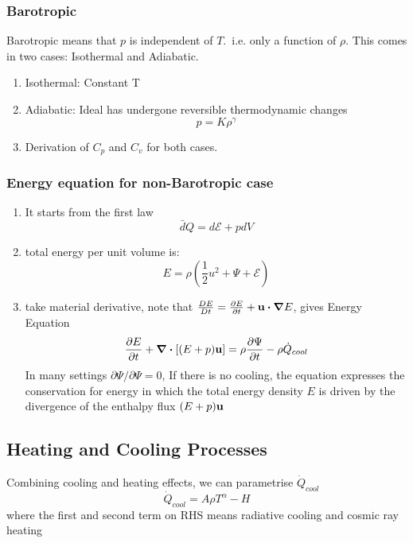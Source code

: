 \documentclass[12pt,a4paper]{article}
\begin{document}
    \subsubsection{Barotropic}
        Barotropic means that $p$ is independent of $T$.\ i.e. only a function of $\rho$. This comes in two cases: Isothermal and Adiabatic.
        \begin{enumerate}
            \item Isothermal: Constant T
            \item Adiabatic: Ideal has undergone reversible thermodynamic changes
            \begin{equation}
                p= K \rho^{\gamma}
            \end{equation} 
            \item Derivation of $C_p$ and $C_v$ for both cases.
        \end{enumerate}
    \subsubsection{Energy equation for non-Barotropic case}
        \begin{enumerate}
            \item It starts from the first law
            \begin{equation}
                \bar{d}Q = d \mathcal{E} + pdV
            \end{equation}
            \item total energy per unit volume is:
            \begin{equation}
                E=\rho(\frac{1}{2}u^2 +\Psi + \mathcal{E})
            \end{equation}
            \item take material derivative, note that $\frac{DE}{Dt}=\pdv{E}{t}+\vb{u}\dotproduct\grad{E}$, gives Energy Equation
            \begin{equation}
                \pdv{E}{t}+\div{[(E+p)\vb{u}]= \rho\pdv{\Psi}{t}-\rho \dot{Q}_{cool}}
            \end{equation}
            In many settings $\partial{\Psi}/\partial{\Psi}=0$, If there is no cooling, the equation expresses the conservation for energy in which
            the total energy density $E$ is driven by the divergence of the enthalpy flux $(E+p)\vb{u}$
        \end{enumerate}
    \subsection{Heating and Cooling Processes}
        Combining cooling and heating effects, we can parametrise $\dot{Q}_{cool}$
        \begin{equation}
            \dot{Q}_{cool} = A \rho T^{\alpha} - H
        \end{equation}
        where the first and second term on RHS means radiative cooling and cosmic ray heating
\end{document}
